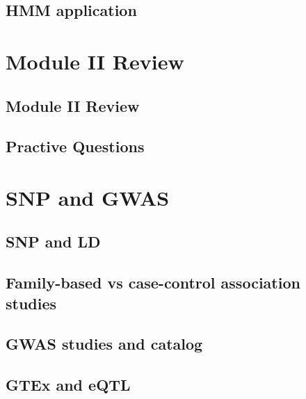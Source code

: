 \documentclass[]{book}
\begin{document}
\hypertarget{hmm-application}{%
\section{HMM application}\label{hmm-application}}

\hypertarget{m2re}{%
\chapter{Module II Review}\label{m2re}}

\hypertarget{module-ii-review}{%
\section{Module II Review}\label{module-ii-review}}

\hypertarget{practive-questions}{%
\section{Practive Questions}\label{practive-questions}}

\hypertarget{gwas1}{%
\chapter{SNP and GWAS}\label{gwas1}}

\hypertarget{snp-and-ld}{%
\section{SNP and LD}\label{snp-and-ld}}

\hypertarget{family-based-vs-case-control-association-studies}{%
\section{Family-based vs case-control association studies}\label{family-based-vs-case-control-association-studies}}

\hypertarget{gwas-studies-and-catalog}{%
\section{GWAS studies and catalog}\label{gwas-studies-and-catalog}}

\hypertarget{gtex-and-eqtl}{%
\section{GTEx and eQTL}\label{gtex-and-eqtl}}
\end{document}
